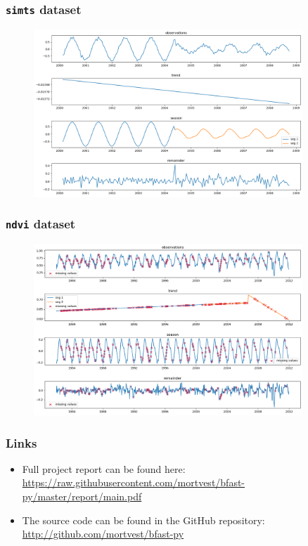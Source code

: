 \documentclass[9pt]{beamer}
\begin{document}
\begin{frame}
\frametitle{\texttt{simts} dataset}
\begin{figure}[H]
  \centering
  \includegraphics[width=0.9\textwidth]{imgs/simts.png}
\end{figure}
\end{frame}

\begin{frame}
\frametitle{\texttt{ndvi} dataset}
\begin{figure}[H]
  \centering
  \includegraphics[width=0.9\textwidth]{imgs/ndvi.png}
\end{figure}
\end{frame}

\begin{frame}
\frametitle{Links}
\centering
\begin{itemize}
\item Full project report can be found here:\\
  \url{https://raw.githubusercontent.com/mortvest/bfast-py/master/report/main.pdf}
\item The source code can be found in the GitHub repository:\\
  \url{http://github.com/mortvest/bfast-py}
\end{itemize}
\end{frame}
\end{document}
